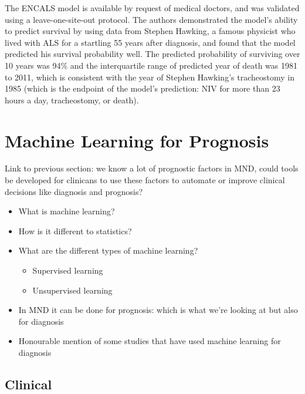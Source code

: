 The ENCALS model is available by request of medical doctors, and was validated using a leave-one-site-out protocol.
The authors demonstrated the model's ability to predict survival by using data from Stephen Hawking, a famous physicist who lived with ALS for a startling 55 years after diagnosis, and found that the model predicted his survival probability well.
The predicted probability of surviving over 10 years was 94\% and the interquartile range of predicted year of death was 1981 to 2011, which is consistent with the year of Stephen Hawking's tracheostomy in 1985 (which is the endpoint of the model's prediction: NIV for more than 23 hours a day, tracheostomy, or death).


\section{Machine Learning for Prognosis}


Link to previous section: we know a lot of prognostic factors in MND, could tools be developed for clinicans to use these factors to automate or improve clinical decisions like diagnosis and prognosis?


\begin{itemize}
    \item What is machine learning?
    \item How is it different to statistics?
    \item What are the different types of machine learning?
    \begin{itemize}
        \item Supervised learning
        \item Unsupervised learning
    \end{itemize}
    \item In MND it can be done for prognosis: which is what we're looking at but also for diagnosis
    \item Honourable mention of some studies that have used machine learning for diagnosis
\end{itemize}



\subsection{Clinical}



